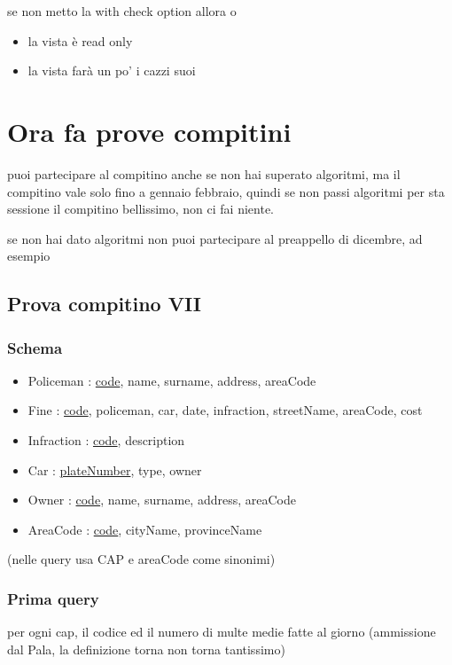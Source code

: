 \documentclass[11pt]{article}
\begin{document}
se non metto la with check option allora o
\begin{itemize}
\item la vista è read only
\item la vista farà un po' i cazzi suoi
\end{itemize}

\section{Ora fa prove compitini}
\label{sec:org0226520}
puoi partecipare al compitino anche se non hai superato algoritmi, ma il compitino vale
solo fino a gennaio febbraio, quindi se non passi algoritmi per sta sessione il compitino
bellissimo, non ci fai niente.

se non hai dato algoritmi non puoi partecipare al preappello di dicembre, ad esempio

\subsection{Prova compitino VII}
\label{sec:org15df7e6}
\subsubsection{Schema}
\label{sec:org3cdd896}
\begin{itemize}
\item Policeman : \uline{code}, name, surname, address, areaCode
\item Fine : \uline{code}, policeman, car, date, infraction, streetName, areaCode, cost
\item Infraction : \uline{code}, description
\item Car : \uline{plateNumber}, type, owner
\item Owner : \uline{code}, name, surname, address, areaCode
\item AreaCode : \uline{code}, cityName, provinceName
\end{itemize}

(nelle query usa CAP e areaCode come sinonimi)
\subsubsection{Prima query}
\label{sec:orgcb41b94}
per ogni cap, il codice ed il numero di multe medie fatte al giorno
(ammissione dal Pala, la definizione \textpm{} torna \textpm{} non torna tantissimo)
\end{document}
